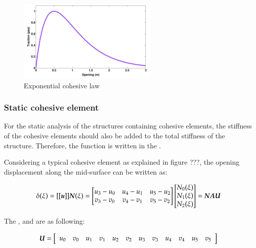  \begin{figure}[!htb]
    \begin{center}
      \includegraphics[width=0.6\textwidth,keepaspectratio=true]{figures/cohesive_exponential.pdf}
      \caption{Exponential cohesive law}
      \label{fig:smm:CL:ECL}
    \end{center}
  \end{figure}



\subsubsection{Static cohesive element}

For  the  static  analysis   of  the  structures  containing  cohesive
elements, the stiffness of the cohesive elements should also be added to the
total      stiffness       of      the      structure.      Therefore,
the  function    is written  in  the
.

Considering a typical cohesive element as explained in figure ???, the opening
displacement along the mid-surface can be written as:

\begin{equation}
  \label{eq:opening}
  \delta(\xi) = [[\boldsymbol{u}]] \boldsymbol{N}(\xi) =
\begin{bmatrix}
u_3-u_0 & u_4-u_1 & u_5-u_2\\
v_3-v_0 & v_4-v_1 & v_5-v_2
\end{bmatrix}
\begin{bmatrix}
N_0(\xi) \\ N_1(\xi) \\ N_2(\xi)
\end{bmatrix} =
\boldsymbol{N A U}
\end{equation}

 The  ,  and  are as following:

\begin{equation}
  \boldsymbol{U} = \left [
\begin{array}{c c c c c c c c c c c c}
u_0 & v_0 & u_1 & v_1 & u_2 & v_2 & u_3 & v_3 & u_4 & v_4 & u_5 & v_5
\end{array}\right ]
\end{equation}


